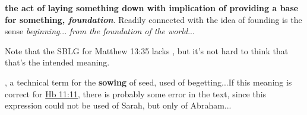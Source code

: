 				\begin{compactdesc}
				
					\item[BDAG 456b] \textbf{}
						\begin{compactitem}
							\item[1] \textbf{the act of laying something down with implication of providing a base for something, \textit{foundation}}. Readily connected with the idea of founding is the sense \textit{beginning}... \textit{from the foundation of the world}...
								\begin{compactitem}
									\item Note that the SBLG for Matthew 13:35 lacks , but it's not hard to think that that's the intended meaning.
								\end{compactitem}
							\item[2] , a technical term for the \textbf{sowing} of seed, used of begetting...If this meaning is correct for \hyperref[HEBREWS-11-11]{Hb 11:11}, there is probably some error in the text, since this expression could not be used of Sarah, but only of Abraham...
						\end{compactitem}
						
						
						
						
						
						

\end{compactdesc}
